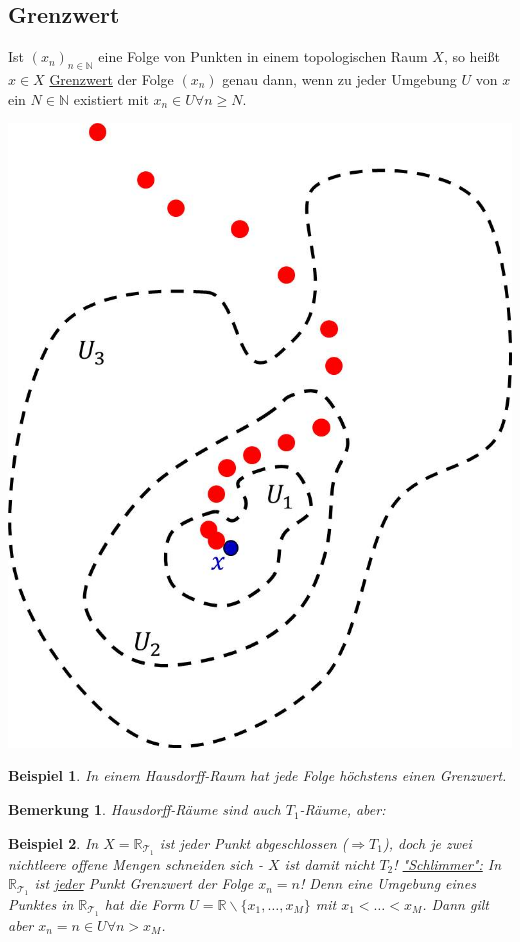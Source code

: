 \documentclass[a4paper,11pt,notitlepage]{report}
\newtheorem{remark}{Bemerkung}[chapter]
\newtheorem{example}{Beispiel}[chapter]
\newcommand{\R}{{\ensuremath{\mathbb{R}}}}
\newcommand{\N}{{\ensuremath{\mathbb{N}}}}
\newenvironment{Kasten}[1]
{
\hspace{0.05\linewidth}
\begin{center}
\begin{minipage}{0.9\linewidth}
\setlength{\fboxsep}{10pt}
\definecolor{shadecolor}{gray}{1}
\definecolor{framecolor}{gray}{0}
\def\FrameCommand{\fcolorbox{framecolor}{shadecolor}}
\MakeFramed {\FrameRestore}
\subsection{#1}
\begin{itshape}
}
{
\end{itshape}
\endMakeFramed
\end{minipage}
\end{center}
}
\begin{document}
\begin{Kasten}{Grenzwert}
Ist $(x_n)_{n \in \N}$ eine Folge von Punkten in einem topologischen Raum $X$, so heißt $x \in X$ \underline{Grenzwert} der Folge $(x_n)$ genau dann, wenn zu jeder Umgebung $U$ von $x$ ein $N \in \N$ existiert mit $x_n \in U \forall n \geq N$. 
\newline
\end{Kasten}
\includegraphics[scale=0.5]{images/Grenzwert.jpg}

\begin{example}
In einem Hausdorff-Raum hat jede Folge höchstens einen Grenzwert.
\end{example}

\begin{remark}
Hausdorff-Räume sind auch $T_1$-Räume, aber:
\end{remark}

\begin{example}
	In $X=\R_{\mathcal{T}_1}$ ist jeder Punkt abgeschlossen ($\Rightarrow T_1$), doch je zwei nichtleere offene Mengen schneiden sich - $X$ ist damit nicht $T_2$!
	\underline{"Schlimmer":} In $\R_{\mathcal{T}_1}$ ist \underline{jeder} Punkt Grenzwert der Folge $x_n = n$!
	Denn eine Umgebung eines Punktes in $\R_{\mathcal{T}_1}$ hat die Form $U = \R \backslash \{x_1, \ldots, x_M\}$ mit $x_1 < \ldots < x_M$. Dann gilt aber $x_n = n \in U \forall n > x_M$.
\end{example}
\end{document}
